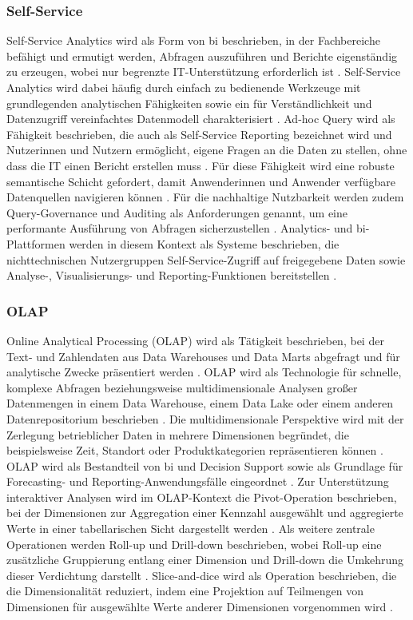 \subsubsection{Self-Service}
Self-Service Analytics wird als Form von \gls{bi} beschrieben, in der Fachbereiche befähigt und ermutigt werden, Abfragen auszuführen und Berichte eigenständig zu erzeugen, wobei nur begrenzte IT-Unterstützung erforderlich ist \cite{GartnerSelfServiceAnalytics}. Self-Service Analytics wird dabei häufig durch einfach zu bedienende Werkzeuge mit grundlegenden analytischen Fähigkeiten sowie ein für Verständlichkeit und Datenzugriff vereinfachtes Datenmodell charakterisiert \cite{GartnerSelfServiceAnalytics}. Ad-hoc Query wird als Fähigkeit beschrieben, die auch als Self-Service Reporting bezeichnet wird und Nutzerinnen und Nutzern ermöglicht, eigene Fragen an die Daten zu stellen, ohne dass die IT einen Bericht erstellen muss \cite{GartnerInformationDelivery}. Für diese Fähigkeit wird eine robuste semantische Schicht gefordert, damit Anwenderinnen und Anwender verfügbare Datenquellen navigieren können \cite{GartnerInformationDelivery}. 
Für die nachhaltige Nutzbarkeit werden zudem Query-Governance und Auditing als Anforderungen genannt, um eine performante Ausführung von Abfragen sicherzustellen \cite{GartnerInformationDelivery}. 
Analytics- und \gls{bi}-Plattformen werden in diesem Kontext als Systeme beschrieben, die nichttechnischen Nutzergruppen Self-Service-Zugriff auf freigegebene Daten sowie Analyse-, Visualisierungs- und Reporting-Funktionen bereitstellen \cite{GartnerABIPlatformReq}. 

\subsubsection{OLAP}
Online Analytical Processing (OLAP) wird als Tätigkeit beschrieben, bei der Text- und Zahlendaten aus Data Warehouses und Data Marts abgefragt und für analytische Zwecke präsentiert werden \cite{JukicJukicMalliaris2008OLAP}. OLAP wird als Technologie für schnelle, komplexe Abfragen beziehungsweise multidimensionale Analysen großer Datenmengen in einem Data Warehouse, einem Data Lake oder einem anderen Datenrepositorium beschrieben \cite{IBMOlap}. Die multidimensionale Perspektive wird mit der Zerlegung betrieblicher Daten in mehrere Dimensionen begründet, die beispielsweise Zeit, Standort oder Produktkategorien repräsentieren können \cite{IBMOlap}. OLAP wird als Bestandteil von \gls{bi} und Decision Support sowie als Grundlage für Forecasting- und Reporting-Anwendungsfälle eingeordnet \cite{IBMOlap}. Zur Unterstützung interaktiver Analysen wird im OLAP-Kontext die Pivot-Operation beschrieben, bei der Dimensionen zur Aggregation einer Kennzahl ausgewählt und aggregierte Werte in einer tabellarischen Sicht dargestellt werden \cite{ChaudhuriDayal1997}. Als weitere zentrale Operationen werden Roll-up und Drill-down beschrieben, wobei Roll-up eine zusätzliche Gruppierung entlang einer Dimension und Drill-down die Umkehrung dieser Verdichtung darstellt \cite{ChaudhuriDayal1997}. Slice-and-dice wird als Operation beschrieben, die die Dimensionalität reduziert, indem eine Projektion auf Teilmengen von Dimensionen für ausgewählte Werte anderer Dimensionen vorgenommen wird \cite{ChaudhuriDayal1997}. 

